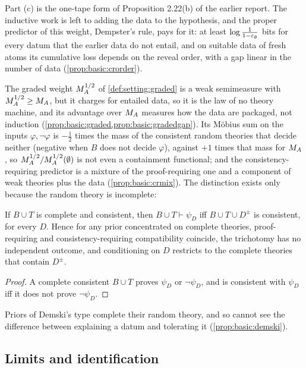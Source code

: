 Part (c) is the one-tape form of Proposition 2.22(b) of the earlier report. The inductive work is left to adding the data to the hypothesis, and the proper predictor of this weight, Dempster's rule, pays for it: at least $\log\frac1{1-\varepsilon_{\emptyset}}$ bits for every datum that the earlier data do not entail, and on suitable data of fresh atoms its cumulative loss depends on the reveal order, with a gap linear in the number of data (\cref{prop:basic:crorder}).

The graded weight $M_{A}^{1/2}$ of \cref{def:setting:graded} is a weak semimeasure with $M_{A}^{1/2}\ge M_{A}$, but it charges for entailed data, so it is the law of no theory machine, and its advantage over $M_{A}$ measures how the data are packaged, not induction (\cref{prop:basic:graded,prop:basic:gradedgap}). Its Möbius sum on the inputs $\varphi,\neg\varphi$ is $-\frac12$ times the mass of the consistent random theories that decide neither (negative when $B$ does not decide $\varphi$), against $+1$ times that mass for $M_{A}$, so $M_{A}^{1/2}/M_{A}^{1/2}(\emptyset)$ is not even a containment functional; and the consistency-requiring predictor is a mixture of the proof-requiring one and a component of weak theories plus the data (\cref{prop:basic:crmix}). The distinction exists only because the random theory is incomplete:

\begin{proposition}\label{prop:basic:prcr}
If $B\cup T$ is complete and consistent, then $B\cup T\vdash\psi_D$ iff $B\cup T\cup D^\pm$ is consistent, for every $D$. Hence for any prior concentrated on complete theories, proof-requiring and consistency-requiring compatibility coincide, the trichotomy has no independent outcome, and conditioning on $D$ restricts to the complete theories that contain $D^\pm$.
\end{proposition}

\begin{proof}
A complete consistent $B\cup T$ proves $\psi_D$ or $\neg\psi_D$, and is consistent with $\psi_D$ iff it does not prove $\neg\psi_D$.
\end{proof}

Priors of Demski's type complete their random theory, and so cannot see the difference between explaining a datum and tolerating it (\cref{prop:basic:demski}).

\subsection{Limits and identification}\label{sec:basic:limits}

